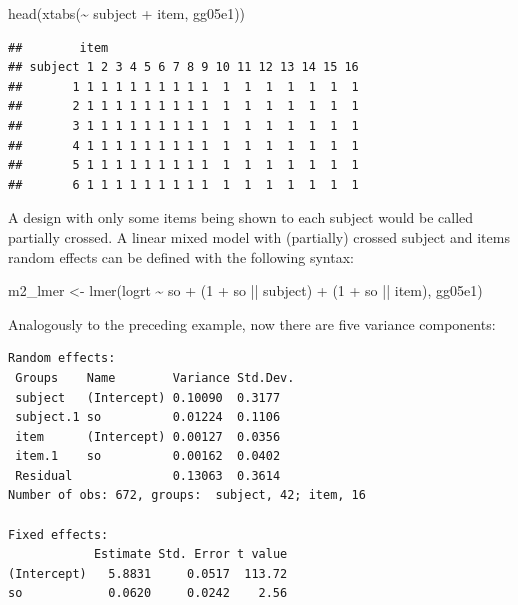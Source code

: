 \documentclass[
  12pt,
]{krantz}
\newenvironment{Shaded}{\begin{snugshade}}{\end{snugshade}}
\newcommand{\DecValTok}[1]{\textcolor[rgb]{0.00,0.00,0.81}{#1}}
\newcommand{\FunctionTok}[1]{\textcolor[rgb]{0.00,0.00,0.00}{#1}}
\newcommand{\NormalTok}[1]{#1}
\newcommand{\OtherTok}[1]{\textcolor[rgb]{0.56,0.35,0.01}{#1}}
\newcommand{\SpecialCharTok}[1]{\textcolor[rgb]{0.00,0.00,0.00}{#1}}
\theoremstyle{definition}
\theoremstyle{definition}
\theoremstyle{definition}
\theoremstyle{definition}
\theoremstyle{remark}
\begin{document}
\begin{Shaded}
\begin{Highlighting}[]
\FunctionTok{head}\NormalTok{(}\FunctionTok{xtabs}\NormalTok{(}\SpecialCharTok{\textasciitilde{}}\NormalTok{ subject }\SpecialCharTok{+}\NormalTok{ item, gg05e1))}
\end{Highlighting}
\end{Shaded}

\begin{verbatim}
##        item
## subject 1 2 3 4 5 6 7 8 9 10 11 12 13 14 15 16
##       1 1 1 1 1 1 1 1 1 1  1  1  1  1  1  1  1
##       2 1 1 1 1 1 1 1 1 1  1  1  1  1  1  1  1
##       3 1 1 1 1 1 1 1 1 1  1  1  1  1  1  1  1
##       4 1 1 1 1 1 1 1 1 1  1  1  1  1  1  1  1
##       5 1 1 1 1 1 1 1 1 1  1  1  1  1  1  1  1
##       6 1 1 1 1 1 1 1 1 1  1  1  1  1  1  1  1
\end{verbatim}

A design with only some items being shown to each subject would be called partially crossed.
A linear mixed model with (partially) crossed subject and items random effects can be defined with the following syntax:

\begin{Shaded}
\begin{Highlighting}[]
\NormalTok{m2\_lmer }\OtherTok{\textless{}{-}} \FunctionTok{lmer}\NormalTok{(logrt }\SpecialCharTok{\textasciitilde{}}\NormalTok{ so }\SpecialCharTok{+}\NormalTok{ (}\DecValTok{1} \SpecialCharTok{+}\NormalTok{ so }\SpecialCharTok{||}\NormalTok{ subject) }\SpecialCharTok{+}
\NormalTok{  (}\DecValTok{1} \SpecialCharTok{+}\NormalTok{ so }\SpecialCharTok{||}\NormalTok{ item), gg05e1)}
\end{Highlighting}
\end{Shaded}

Analogously to the preceding example, now there are five variance components:

\begin{verbatim}
Random effects:
 Groups    Name        Variance Std.Dev.
 subject   (Intercept) 0.10090  0.3177  
 subject.1 so          0.01224  0.1106  
 item      (Intercept) 0.00127  0.0356  
 item.1    so          0.00162  0.0402  
 Residual              0.13063  0.3614  
Number of obs: 672, groups:  subject, 42; item, 16

Fixed effects:
            Estimate Std. Error t value
(Intercept)   5.8831     0.0517  113.72
so            0.0620     0.0242    2.56
\end{verbatim}
\end{document}
